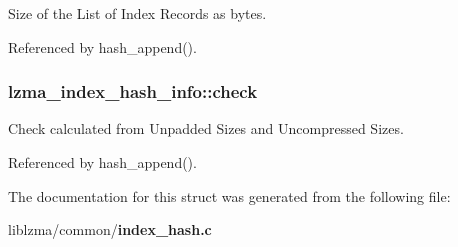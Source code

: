 Size of the List of Index Records as bytes. 



Referenced by hash\-\_\-append().

\subsubsection[{check}]{ lzma\-\_\-index\-\_\-hash\-\_\-info\-::check}\label{structlzma__index__hash__info_a80edd4084ad4718897628e52a152dad3}


Check calculated from Unpadded Sizes and Uncompressed Sizes. 



Referenced by hash\-\_\-append().



The documentation for this struct was generated from the following file\-:\begin{DoxyCompactItemize}
\item 
liblzma/common/{\bf index\-\_\-hash.\-c}\end{DoxyCompactItemize}
